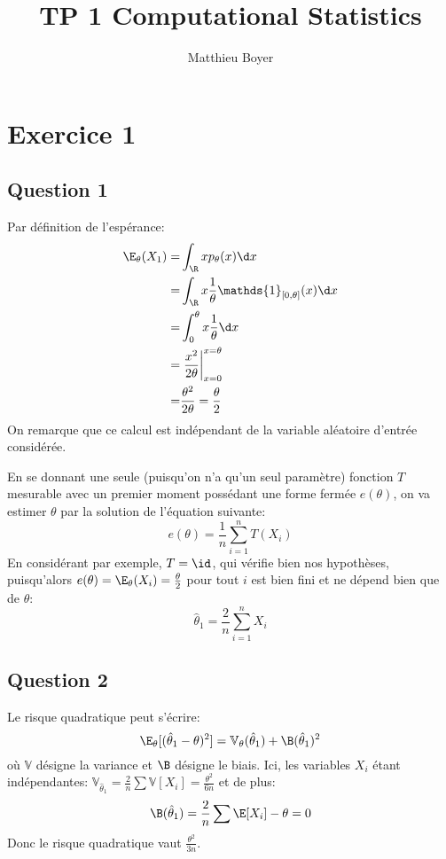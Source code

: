 \documentclass[math, info]{mpb-cours}
\title{TP 1 Computational Statistics}
\author{Matthieu Boyer}
\def\that{\hat{\theta}}
\def\V{\mathbb{V}}
\begin{document}
\maketitle

\section{Exercice 1}
\subsection{Question 1}
Par définition de l'espérance:
\begin{equation*}
	\begin{aligned}
		\E_{\theta}(X_{1}) = & \int_{\R}xp_{\theta}(x)\d x                               \\
		=                    & \int_{\R}x\frac{1}{\theta}\mathds{1}_{[0, \theta]}(x)\d x \\
		=                    & \int_{0}^{\theta} x\frac{1}{\theta}\d x                   \\
		=                    & \left.\frac{x^{2}}{2\theta}\right|_{x= 0}^{x = \theta}    \\
		=                    & \frac{\theta^{2}}{2\theta} = \frac{\theta}{2}
	\end{aligned}
\end{equation*}
On remarque que ce calcul est indépendant de la variable aléatoire d'entrée considérée.

En se donnant une seule (puisqu'on n'a qu'un seul paramètre) fonction $T$ mesurable avec un premier moment possédant une forme fermée $e(\theta)$, on va estimer $\theta$ par la solution de l'équation suivante:
\begin{equation*}
	e(\theta) = \frac{1}{n}\sum_{i = 1}^{n}T(X_{i})
\end{equation*}
En considérant par exemple, $T = \id$, qui vérifie bien nos hypothèses, puisqu'alors $e(\theta) = \E_{\theta}(X_{i}) = \frac{\theta}{2}$ pour tout $i$ est bien fini et ne dépend bien que de $\theta$:
\begin{equation*}
	\that_{1} = \frac{2}{n}\sum_{i = 1}^{n}X_{i}
\end{equation*}

\subsection{Question 2}
Le risque quadratique peut s'écrire:
\begin{equation*}
	\E_{\theta}[(\that_{1} - \theta)^{2}] = \V_{\theta}(\that_{1}) + \B(\that_{1})^{2}
\end{equation*}
où $\V$ désigne la variance et $\B$ désigne le biais.
Ici, les variables $X_{i}$ étant indépendantes: $\V_{\that_{1}} = \frac{2}{n}\sum \V[X_{i}] = \frac{\theta^{2}}{6n}$ et de plus:
\begin{equation*}
	\B(\that_{1}) = \frac{2}{n}\sum \E[X_{i}] - \theta = 0
\end{equation*}
Donc le risque quadratique vaut $\frac{\theta^{2}}{3n}$.
\end{document}
